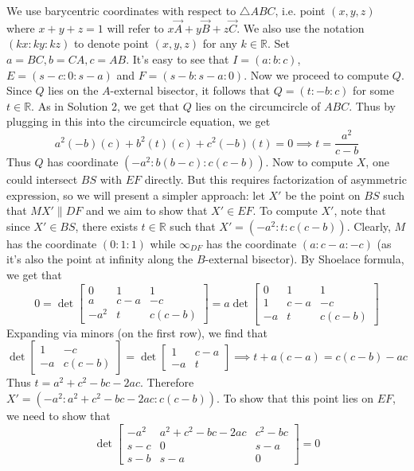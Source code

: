 We use barycentric coordinates with respect to $\triangle ABC$, i.e. point $(x,y,z)$ where $x+y+z=1$ will refer to $x\vec{A}+y\vec{B}+z\vec{C}$. We also use the notation $(kx:ky:kz)$ to denote point $(x,y,z)$ for any $k\in\mathbb{R}$.
\nl
Set $a=BC, b=CA, c=AB$. It's easy to see that $I=(a:b:c)$, $E=(s-c:0:s-a)$ and $F=(s-b:s-a:0)$. Now we proceed to compute $Q$. Since $Q$ lies on the $A$-external bisector, it follows that $Q=(t:-b:c)$ for some $t\in\mathbb{R}$. As in Solution 2, we get that $Q$ lies on the circumcircle of $ABC$. Thus by plugging in this into the circumcircle equation, we get 
$$a^2(-b)(c) + b^2(t)(c) + c^2(-b)(t)=0 \implies t = \frac{a^2}{c-b}$$
Thus $Q$ has coordinate $(-a^2: b(b-c):c(c-b))$. Now to compute $X$, one could intersect $BS$ with $EF$ directly. But this requires factorization of asymmetric expression, so we will present a simpler approach: let $X'$ be the point on $BS$ such that $MX'\parallel DF$ and we aim to show that $X'\in EF$.
\nl
To compute $X'$, note that since $X'\in BS$, there exists $t\in\mathbb{R}$ such that $X' = (-a^2:t:c(c-b))$. Clearly, $M$ has the coordinate $(0:1:1)$ while $\infty_{DF}$ has the coordinate $(a:c-a:-c)$ (as it's also the point at infinity along the $B$-external bisector). By Shoelace formula, we get that
$$0 = \det\begin{bmatrix}
    0 & 1 & 1 \\
    a & c-a & -c \\
    -a^2 & t & c(c-b)
\end{bmatrix}  = a\det\begin{bmatrix}
    0 & 1 & 1 \\
    1 & c-a & -c \\
    -a & t & c(c-b)
\end{bmatrix}
$$ 
Expanding via minors (on the first row), we find that
$$\det\begin{bmatrix}
    1 & -c \\
    -a & c(c-b)
\end{bmatrix} = \det\begin{bmatrix}
    1 & c-a \\
    -a & t
\end{bmatrix} \implies t+a(c-a) = c(c-b)-ac$$
Thus $t=a^2+c^2-bc-2ac$. Therefore $X' = (-a^2 : a^2+c^2-bc-2ac : c(c-b))$. To show that this point lies on $EF$, we need to show that
$$\det\begin{bmatrix}
    -a^2 & a^2+c^2-bc-2ac & c^2-bc \\
    s-c & 0 & s-a \\
    s-b & s-a & 0
\end{bmatrix} = 0$$
